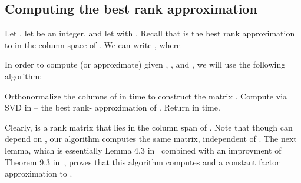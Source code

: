 \subsection{Computing the best rank  approximation
} \label{sec:bestrankk}

Let , let  be an integer, and let  with . Recall that  is the best rank  approximation to \math{\matA} in the column space of \math{\matC}. We can write , where

In order to compute (or approximate)  given ,
, and , we will use the following algorithm:
\begin{center}
\begin{algorithmic}[1]
\STATE Orthonormalize the columns of  in  time to construct the matrix .
\STATE Compute
  via SVD
in  -- the best rank- approximation of
\math{\matQ\transp\matA}.
\STATE Return  in  time.
\end{algorithmic}
\end{center}
\medskip
Clearly,  is a rank  matrix that lies in the column span of . Note that though   can depend on \math{\xi}, our algorithm computes the same matrix, independent of \math{\xi}. The next lemma, which is essentially Lemma 4.3 in~\cite{CW09} combined with an improvment of Theorem 9.3 in~\cite{HMT},
proves that this algorithm computes  and a constant factor approximation to .
